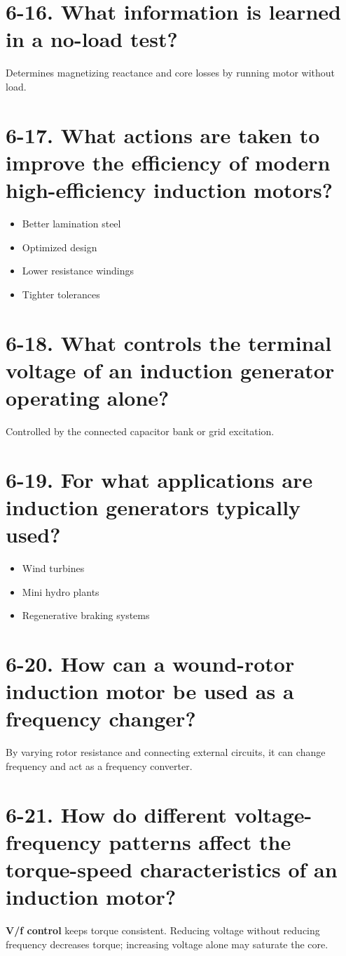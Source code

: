 \documentclass[a4paper,12pt]{article}
\begin{document}
\section*{6-16. What information is learned in a no-load test?}
Determines magnetizing reactance and core losses by running motor without load.

\section*{6-17. What actions are taken to improve the efficiency of modern high-efficiency induction motors?}
\begin{itemize}
	\item Better lamination steel
	\item Optimized design
	\item Lower resistance windings
	\item Tighter tolerances
\end{itemize}

\section*{6-18. What controls the terminal voltage of an induction generator operating alone?}
Controlled by the connected capacitor bank or grid excitation.

\section*{6-19. For what applications are induction generators typically used?}
\begin{itemize}
	\item Wind turbines
	\item Mini hydro plants
	\item Regenerative braking systems
\end{itemize}

\section*{6-20. How can a wound-rotor induction motor be used as a frequency changer?}
By varying rotor resistance and connecting external circuits, it can change frequency and act as a frequency converter.

\section*{6-21. How do different voltage-frequency patterns affect the torque-speed characteristics of an induction motor?}
\textbf{V/f control} keeps torque consistent. Reducing voltage without reducing frequency decreases torque; increasing voltage alone may saturate the core.
\end{document}
